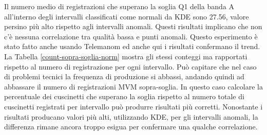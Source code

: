 Il numero medio di registrazioni che superano la soglia Q1 della banda A all'interno degli intervalli classificati come normali da KDE sono 27.56, valore persino più alto rispetto agli intervalli anomali. Questi risultati implicano che non c'è nessuna correlazione tra qualità bassa e punti anomali. 
Questo esperimento è stato fatto anche usando Telemanom ed anche qui i risultati confermano il trend.
La Tabella \ref{count-sopra-soglia-norm} mostra gli stessi conteggi ma rapportati rispetto al numero di registrazione per ogni intervallo. Può capitare che nel caso di problemi tecnici la frequenza di produzione si abbassi, andando quindi ad abbassare il numero di registrazioni MVM sopra-soglia. In questo caso calcolare la percentuale dei cuscinetti che superano la soglia rispetto al numero totale di cuscinetti registrati per intervallo può produrre risultati più corretti. 
Nonostante i risultati producano valori più alti, utilizzando KDE, per gli intervalli anomali, la differenza rimane ancora troppo esigua per confermare una qualche correlazione. 

\begin{table}[ht]
\centering
{}
\caption{\label{count-sopra-soglia}Numero medio di cuscinetti sopra-soglia per intervallo}
\end{table}

